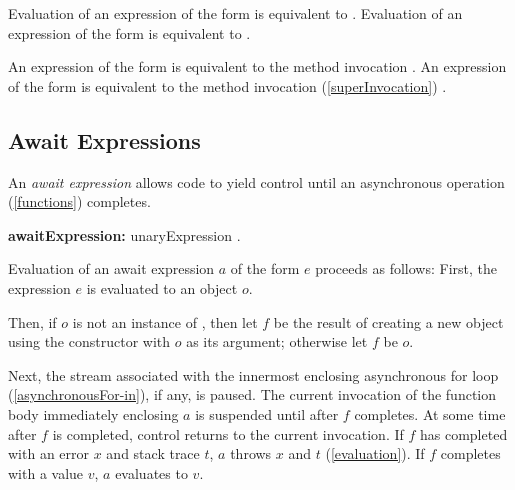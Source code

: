 \documentclass{article}
\begin{document}
\LMHash{}
Evaluation of an expression of the form  is equivalent to .
Evaluation of an expression of the form  is equivalent to .


\LMHash{}
An expression of the form  is equivalent to the method invocation .
An expression of the form  is equivalent to the method invocation (\ref{superInvocation}) .


\subsection{Await Expressions}

\LMHash{}
An {\em await expression} allows code to yield control until an asynchronous operation (\ref{functions}) completes.

\begin{grammar}
{\bf awaitExpression:}\AWAIT{} unaryExpression
  .
\end{grammar}

\LMHash{}
Evaluation of an await expression $a$ of the form \AWAIT{} $e$ proceeds as follows:
First, the expression $e$ is evaluated to an object $o$.

\LMHash{}
Then, if $o$ is not an instance of , then let $f$ be the result of creating a new object using the constructor  with $o$ as its argument; otherwise let $f$ be $o$.

\LMHash{}
Next, the stream associated with the innermost enclosing asynchronous for loop (\ref{asynchronousFor-in}), if any, is paused.
The current invocation of the function body immediately enclosing $a$ is suspended until after $f$ completes.
At some time after $f$ is completed, control returns to the current invocation.
If $f$ has completed with an error $x$ and stack trace $t$, $a$ throws $x$ and $t$ (\ref{evaluation}).
If $f$ completes with a value $v$, $a$ evaluates to $v$.

\end{document}
